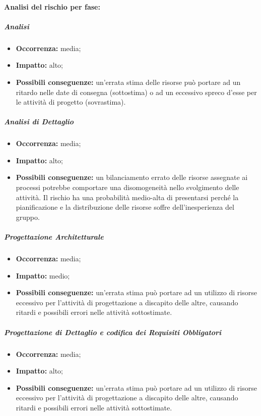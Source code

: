 \documentclass[../PianoProgetto.tex]{subfiles}
\begin{document}
	\paragraph*{Analisi del rischio per fase:} 

		\subparagraph*{Analisi}
			\begin{itemize}[label={-}]
				\item \textbf{Occorrenza:} media;
				\item \textbf{Impatto:} alto;
				\item \textbf{Possibili conseguenze:} un'errata stima delle risorse può portare ad un ritardo nelle date di consegna (sottostima) o ad un eccessivo spreco d'esse per le attività di progetto (sovrastima).
			\end{itemize}
			
		\subparagraph*{Analisi di Dettaglio}
			\begin{itemize}[label={-}]
				\item \textbf{Occorrenza:} media;
				\item \textbf{Impatto:} alto;
				\item \textbf{Possibili conseguenze:} un bilanciamento errato delle risorse assegnate ai processi potrebbe comportare una disomogeneità nello svolgimento delle attività. Il rischio ha una probabilità medio-alta di presentarsi perché la pianificazione e la distribuzione delle risorse soffre dell'inesperienza del gruppo.
			\end{itemize}
			
		\subparagraph*{Progettazione Architetturale}
			\begin{itemize}[label={-}]
				\item \textbf{Occorrenza:} media;
				\item \textbf{Impatto:} medio;
				\item \textbf{Possibili conseguenze:} un'errata stima può portare ad un utilizzo di risorse eccessivo per l'attività di progettazione a discapito delle altre, causando ritardi e possibili errori nelle attività sottostimate.
			\end{itemize}
			
		\subparagraph*{Progettazione di Dettaglio e codifica dei Requisiti Obbligatori}
			\begin{itemize}[label={-}]
				\item \textbf{Occorrenza:} media;
				\item \textbf{Impatto:} alto;
				\item \textbf{Possibili conseguenze:} un'errata stima può portare ad un utilizzo di risorse eccessivo per l'attività di progettazione a discapito delle altre, causando ritardi e possibili errori nelle attività sottostimate. 
			\end{itemize}
			
\end{document}
